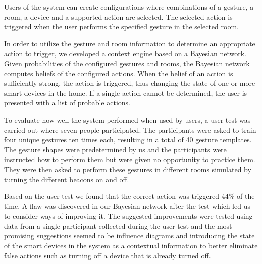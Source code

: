 Users of the system can create configurations where combinations of a gesture, a room, a device and a supported action are selected. The selected action is triggered when the user performs the specified gesture in the selected room.

In order to utilize the gesture and room information to determine an appropriate action to trigger, we developed a context engine based on a Bayesian network. Given probabilities of the configured gestures and rooms, the Bayesian network computes beliefs of the configured actions. When the belief of an action is sufficiently strong, the action is triggered, thus changing the state of one or more smart devices in the home. If a single action cannot be determined, the user is presented with a list of probable actions.

To evaluate how well the system performed when used by users, a user test was carried out where seven people participated.
The participants were asked to train four unique gestures ten times each, resulting in a total of 40 gesture templates.
The gesture shapes were predetermined by us and the participants were instructed how to perform them but were given no opportunity to practice them.
They were then asked to perform these gestures in different rooms simulated by turning the different beacons on and off.

Based on the user test we found that the correct action was triggered 44\% of the time.
A flaw was discovered in our Bayesian network after the test which led us to consider ways of improving it.
The suggested improvements were tested using data from a single participant collected during the user test and the most promising suggestions seemed to be influence diagrams and introducing the state of the smart devices in the system as a contextual information to better eliminate false actions such as turning off a device that is already turned off.

